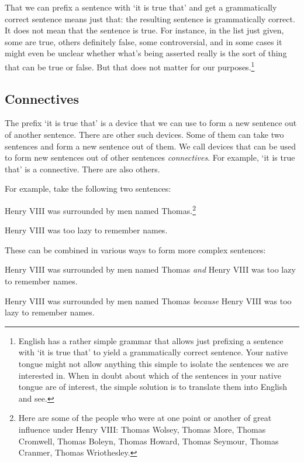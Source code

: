 That we can prefix a sentence with `it is true that' and get a grammatically 
correct sentence means just that: the resulting sentence is grammatically 
correct. It does not mean that the sentence is true. For instance, in the list 
just given, some are true, others definitely false, some controversial, and in 
some cases it might even be unclear whether what's being asserted really is the 
sort of thing that can be true or false. But that does not matter for our 
purposes.\footnote{English has a rather simple grammar that allows just 
 prefixing a sentence with `it is true that' to yield a grammatically correct 
 sentence. Your native tongue might not allow anything this simple to isolate 
 the sentences we are interested in. When in doubt about which of the sentences 
in your native tongue are of interest, the simple solution is to translate them 
into English and see.} 

\subsection{Connectives}

The prefix `it is true that' is a device that we can use to form a new sentence 
out of another sentence. There are other such devices. Some of them can take two 
sentences and form a new sentence out of them. We call devices that can be used 
to form new sentences out of other sentences \emph{connectives}. For example, 
`it is true that' is a connective. There are also others.

For example, take the following two sentences:

\begin{slist}
 \item Henry VIII was surrounded by men named Thomas.\footnote{Here are some of 
  the people who were at one point or another of great influence under Henry 
 VIII: Thomas Wolsey, Thomas More, Thomas Cromwell, Thomas Boleyn, Thomas Howard, 
Thomas Seymour, Thomas Cranmer, Thomas Wriothesley.} 

 \item Henry VIII was too lazy to remember names.
\end{slist}

These can be combined in various ways to form more complex sentences:

\begin{slist}

\item Henry VIII was surrounded by men named Thomas \emph{and} Henry VIII was 
 too lazy to remember names.


\item Henry VIII was surrounded by men named Thomas \emph{because} Henry VIII 
 was too lazy to remember names.

\end{slist}

